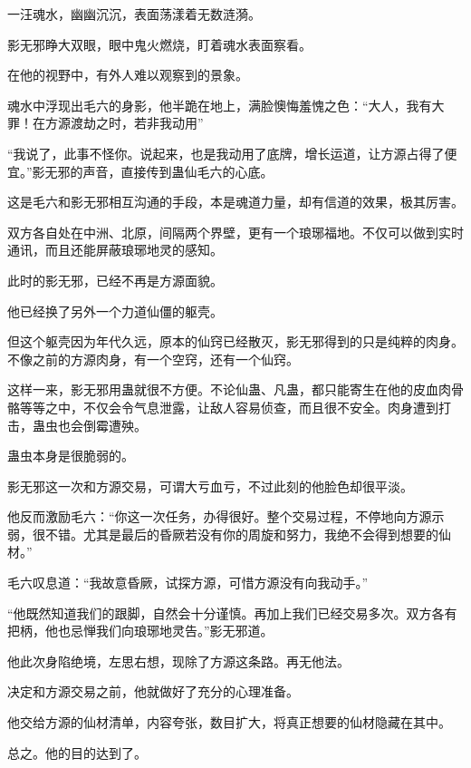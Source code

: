 
\begin{this_body}



一汪魂水，幽幽沉沉，表面荡漾着无数涟漪。

影无邪睁大双眼，眼中鬼火燃烧，盯着魂水表面察看。

在他的视野中，有外人难以观察到的景象。

魂水中浮现出毛六的身影，他半跪在地上，满脸懊悔羞愧之色：“大人，我有大罪！在方源渡劫之时，若非我动用”

“我说了，此事不怪你。说起来，也是我动用了底牌，增长运道，让方源占得了便宜。”影无邪的声音，直接传到蛊仙毛六的心底。

这是毛六和影无邪相互沟通的手段，本是魂道力量，却有信道的效果，极其厉害。

双方各自处在中洲、北原，间隔两个界壁，更有一个琅琊福地。不仅可以做到实时通讯，而且还能屏蔽琅琊地灵的感知。

此时的影无邪，已经不再是方源面貌。

他已经换了另外一个力道仙僵的躯壳。

但这个躯壳因为年代久远，原本的仙窍已经散灭，影无邪得到的只是纯粹的肉身。不像之前的方源肉身，有一个空窍，还有一个仙窍。

这样一来，影无邪用蛊就很不方便。不论仙蛊、凡蛊，都只能寄生在他的皮血肉骨骼等等之中，不仅会令气息泄露，让敌人容易侦查，而且很不安全。肉身遭到打击，蛊虫也会倒霉遭殃。

蛊虫本身是很脆弱的。

影无邪这一次和方源交易，可谓大亏血亏，不过此刻的他脸色却很平淡。

他反而激励毛六：“你这一次任务，办得很好。整个交易过程，不停地向方源示弱，很不错。尤其是最后的昏厥若没有你的周旋和努力，我绝不会得到想要的仙材。”

毛六叹息道：“我故意昏厥，试探方源，可惜方源没有向我动手。”

“他既然知道我们的跟脚，自然会十分谨慎。再加上我们已经交易多次。双方各有把柄，他也忌惮我们向琅琊地灵告。”影无邪道。

他此次身陷绝境，左思右想，现除了方源这条路。再无他法。

决定和方源交易之前，他就做好了充分的心理准备。

他交给方源的仙材清单，内容夸张，数目扩大，将真正想要的仙材隐藏在其中。

总之。他的目的达到了。


\end{this_body}
